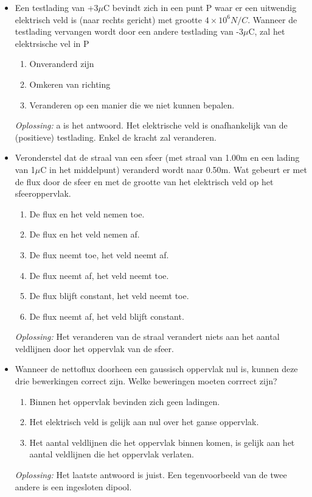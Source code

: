 \documentclass[12pt,a4paper]{article}
\begin{document}
\begin{itemize}
	\item Een testlading van +3$\mu$C bevindt zich in een punt P waar er een uitwendig elektrisch veld is (naar rechts gericht) met grootte \(4 \times 10^6 N/C\). Wanneer de testlading vervangen wordt door een andere testlading van -3$\mu$C, zal het elektrsische vel in P
	\begin{enumerate}[label=\alph*]
		\item Onveranderd zijn
		\item Omkeren van richting
		\item Veranderen op een manier die we niet kunnen bepalen. 
	\end{enumerate}
	\textit{Oplossing:} a is het antwoord. Het elektrische veld is onafhankelijk van de (positieve) testlading. Enkel de kracht zal veranderen. 
	\item Veronderstel dat de straal van een sfeer (met straal van 1.00m en een lading van 1$\mu$C in het middelpunt) veranderd wordt naar 0.50m. Wat gebeurt er met de flux door de sfeer en met de grootte van het elektrisch veld op het sfeeroppervlak. 
	\begin{enumerate}[label=\alph*]
		\item De flux en het veld nemen toe.
		\item De flux en het veld nemen af. 
		\item De flux neemt toe, het veld neemt af. 
		\item De flux neemt af, het veld neemt toe. 
		\item De flux blijft constant, het veld neemt toe.
		\item De flux neemt af, het veld blijft constant.
	\end{enumerate}
	\textit{Oplossing:} Het veranderen van de straal verandert niets aan het aantal veldlijnen door het oppervlak van de sfeer. 
	\item Wanneer de nettoflux doorheen een gaussisch oppervlak nul is, kunnen deze drie bewerkingen correct zijn. Welke beweringen moeten corrrect zijn?
	\begin{enumerate}[label=\alph*]
		\item Binnen het oppervlak bevinden zich geen ladingen.
		\item Het elektrisch veld is gelijk aan nul over het ganse oppervlak.
		\item Het aantal veldlijnen die het oppervlak binnen komen, is gelijk aan het aantal veldlijnen die het oppervlak verlaten. 
	\end{enumerate}
	\textit{Oplossing:} Het laatste antwoord is juist. Een tegenvoorbeeld van de twee andere is een ingesloten dipool. 

\end{itemize}
\end{document}
